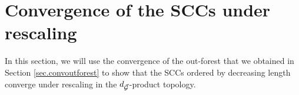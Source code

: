 \section{Convergence of the SCCs under rescaling}\label{sec.convSCCs}

In this section, we will use the convergence of the out-forest that we obtained in Section \ref{sec.convoutforest} to show that the SCCs ordered by decreasing length converge under rescaling in the $d_{\vec{{\mathcal G}}}$-product topology. 


